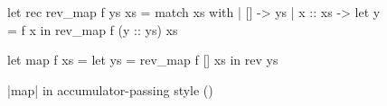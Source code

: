 \begin{figure}[tp]
\begin{OCaml}
let rec rev_map f ys xs =
  match xs with
  | [] ->
      ys
  | x :: xs ->
      let y = f x in
      rev_map f (y :: ys) xs
      
let map f xs =
  let ys = rev_map f [] xs in
  rev ys
\end{OCaml}
\caption{\ocaml|map| in accumulator-passing style (\OCamlLang)}
\label{fig:rev_map}
\end{figure}